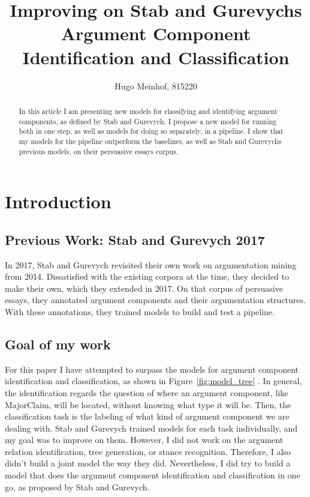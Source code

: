 \documentclass[12]{article}
\title{Improving on Stab and Gurevychs Argument Component Identification and Classification}
\author{Hugo Meinhof, 815220}
\theoremstyle{mytheoremstyle}
\theoremstyle{mytheoremstyle}
\theoremstyle{myproblemstyle}
\begin{document}
  \maketitle
  \begin{abstract}
  In this article I am presenting new models for classifying and identifying argument components, as defined by Stab and Gurevych\cite{stab-gurevych-2017-parsing}. I propose a new model for running both in one step, as well as models for doing so separately, in a pipeline. I show that my models for the pipeline outperform the baselines, as well as Stab and Gurevychs previous models, on their persuasive essays corpus.
  \end{abstract}
  \section{Introduction\dotfill}
  \subsection{Previous Work: Stab and Gurevych 2017}
  In 2017, Stab and Gurevych\cite{stab-gurevych-2017-parsing} revisited their own work on argumentation mining from 2014. Dissatisfied with the existing corpora at the time, they decided to make their own, which they extended in 2017. On that corpus of persuasive essays, they annotated argument components and their argumentation structures. With these annotations, they trained models to build and test a pipeline. 
  \subsection{Goal of my work}
  For this paper I have attempted to surpass the models for argument component identification and classification, as shown in Figure~\ref{fig:model_tree} \cite{stab-gurevych-2017-parsing}. 
  In general, the identification regards the question of where an argument component, like MajorClaim, will be located, without knowing what type it will be. 
  Then, the classification task is the labeling of what kind of argument component we are dealing with. 
  Stab and Gurevych trained models for each task individually, and my goal was to improve on them. 
  However, I did not work on the argument relation identification, tree generation, or stance recognition. 
  Therefore, I also didn't build a joint model the way they did.
  Nevertheless, I did try to build a model that does the argument component identification and classification in one go, as proposed by Stab and Gurevych.
\end{document}
